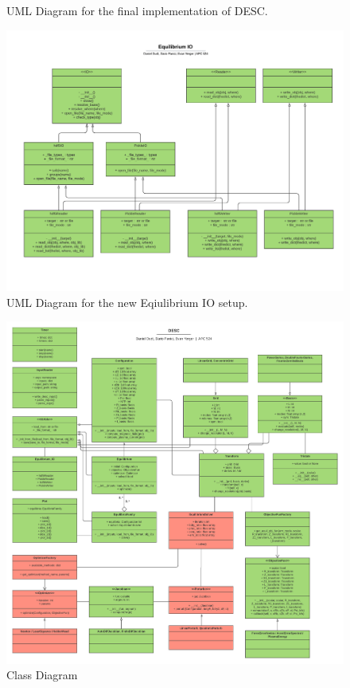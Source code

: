 \documentclass{article}
\begin{document}
\begin{figure}[h]
	\caption{UML Diagram for the final implementation of DESC.} %
	\label{fig:newUML}
\end{figure}

\begin{figure}[h]
	\includegraphics[width=\textwidth]{figs/Equilibrium_IO_UML.pdf}
	\caption{UML Diagram for the new Eqiulibrium IO setup.}
	\label{fig:EQIOUML}
\end{figure}

%
\begin{figure}[H]
	\centering
	\includegraphics[width=1.0\linewidth,center]{./figs/DESC_UML.pdf}
	\caption{Class Diagram}
	\label{fig:UML}
\end{figure}
\end{document}
